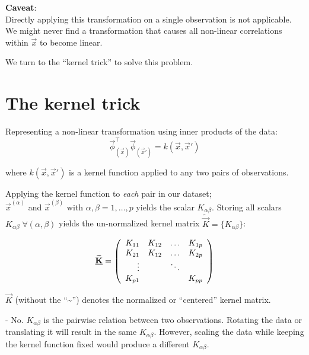 \textbf{Caveat}:\\
Directly applying this transformation on a single observation is not applicable. 
We might never find a transformation that causes all non-linear correlations within $\vec x$ to become linear.

We turn to the ``kernel trick'' to solve this problem.

\newpage

\section{The kernel trick}

Representing a non-linear transformation using inner products of the data:
\begin{equation}
 \label{eq:trick}
      \vec{\phi}_{(\vec{x})}^\top 
		\vec{\phi}_{(\vec{x}')} = 
      k(\vec{x}, \vec{x}')
\end{equation}
    
where $k(\vec{x}, \vec{x}')$ is a kernel function applied 
to any two pairs of observations.

Applying the kernel function to \emph{each} pair in our dataset; \\
$\vec x^{(\alpha)}$ and $\vec{x}^{(\beta)}$ 
with $\alpha, \beta = 1, \ldots, p$ yields the scalar $K_{\alpha \beta}$. 
Storing all scalars $K_{\alpha \beta} \; \forall (\alpha,\beta)$ yields 
the un-normalized kernel matrix $\widetilde {\vec K}=\{K_{\alpha \beta}\}$:

$$
\widetilde {\underline{\mathbf{K}}} = 
\left( \begin{array}{rrrrrrrrrrrrrrrrrrrrrrrrrr} 
K_{11} & K_{12} & \ldots & K_{1p} \\
K_{21} & K_{12} & \ldots & K_{2p} \\
\vdots & & \ddots\\
K_{p1} & & & K_{pp}
\\ \end{array} \right)
$$

$\vec K$ (without the ``\textasciitilde'') denotes the normalized or ``centered'' kernel matrix.



- No. $K_{\alpha \beta}$ is the pairwise relation between two observations. 
Rotating the data or translating it will result in the same $K_{\alpha \beta}$. 
However, scaling the data while keeping the kernel function fixed would produce a different $K_{\alpha \beta}$.

\newpage 

